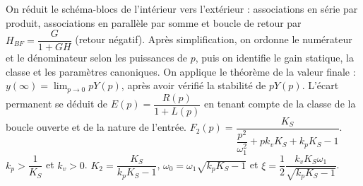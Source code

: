 \begin{corrigebox}[Corrigé]
On réduit le schéma-blocs de l'intérieur vers l'extérieur : associations en série par produit, associations en parallèle par somme et boucle de retour par $H_{BF}=\dfrac{G}{1+GH}$ (retour négatif). Après simplification, on ordonne le numérateur et le dénominateur selon les puissances de $p$, puis on identifie le gain statique, la classe et les paramètres canoniques.
On applique le théorème de la valeur finale : $y(\infty)=\lim_{p\to0}pY(p)$, après avoir vérifié la stabilité de $pY(p)$. L'écart permanent se déduit de $E(p)=\dfrac{R(p)}{1+L(p)}$ en tenant compte de la classe de la boucle ouverte et de la nature de l'entrée.
$F_2(p)=\dfrac{K_S}{\dfrac{p^2}{\omega_1^2}+pk_v K_S +k_pK_S - 1}$.
$k_p>\dfrac{1}{K_S}$ et $k_v>0$.
$K_2 = \dfrac{K_S}{k_p K_S - 1}$, $\omega_0 = \omega_1\sqrt{k_p K_S - 1}$ et $\xi = \dfrac{1}{2}\dfrac{k_vK_S\omega_1}{\sqrt{k_p K_S - 1}}$.
\end{corrigebox}
